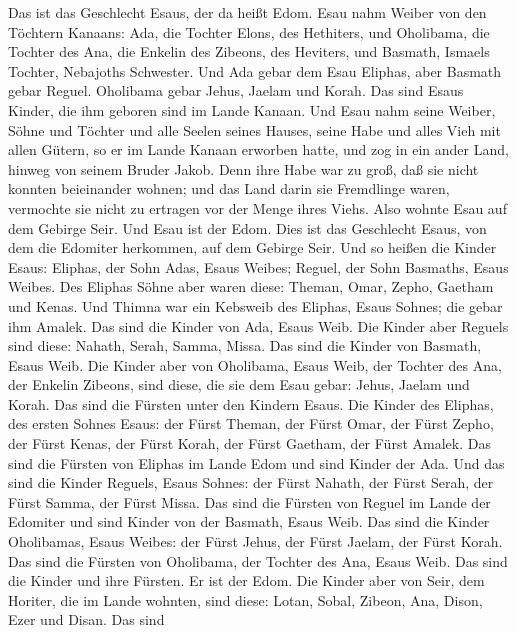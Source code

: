  Das ist das Geschlecht Esaus, der da heißt Edom.
 Esau nahm Weiber von den Töchtern Kanaans: Ada, die Tochter
Elons, des Hethiters, und Oholibama, die Tochter des Ana, die Enkelin
des Zibeons, des Heviters,  und Basmath, Ismaels Tochter,
Nebajoths Schwester.  Und Ada gebar dem Esau Eliphas, aber
Basmath gebar Reguel.  Oholibama gebar Jehus, Jaelam und
Korah. Das sind Esaus Kinder, die ihm geboren sind im Lande Kanaan.
 Und Esau nahm seine Weiber, Söhne und Töchter und alle
Seelen seines Hauses, seine Habe und alles Vieh mit allen Gütern, so er
im Lande Kanaan erworben hatte, und zog in ein ander Land, hinweg von
seinem Bruder Jakob.  Denn ihre Habe war zu groß, daß sie
nicht konnten beieinander wohnen; und das Land darin sie Fremdlinge
waren, vermochte sie nicht zu ertragen vor der Menge ihres Viehs.
 Also wohnte Esau auf dem Gebirge Seir. Und Esau ist der
Edom.  Dies ist das Geschlecht Esaus, von dem die Edomiter
herkommen, auf dem Gebirge Seir.  Und so heißen die Kinder
Esaus: Eliphas, der Sohn Adas, Esaus Weibes; Reguel, der Sohn Basmaths,
Esaus Weibes.  Des Eliphas Söhne aber waren diese: Theman,
Omar, Zepho, Gaetham und Kenas.  Und Thimna war ein
Kebsweib des Eliphas, Esaus Sohnes; die gebar ihm Amalek. Das sind die
Kinder von Ada, Esaus Weib.  Die Kinder aber Reguels sind
diese: Nahath, Serah, Samma, Missa. Das sind die Kinder von Basmath,
Esaus Weib.  Die Kinder aber von Oholibama, Esaus Weib, der
Tochter des Ana, der Enkelin Zibeons, sind diese, die sie dem Esau
gebar: Jehus, Jaelam und Korah.  Das sind die Fürsten unter
den Kindern Esaus. Die Kinder des Eliphas, des ersten Sohnes Esaus: der
Fürst Theman, der Fürst Omar, der Fürst Zepho, der Fürst Kenas,
 der Fürst Korah, der Fürst Gaetham, der Fürst Amalek. Das
sind die Fürsten von Eliphas im Lande Edom und sind Kinder der Ada.
 Und das sind die Kinder Reguels, Esaus Sohnes: der Fürst
Nahath, der Fürst Serah, der Fürst Samma, der Fürst Missa. Das sind die
Fürsten von Reguel im Lande der Edomiter und sind Kinder von der
Basmath, Esaus Weib.  Das sind die Kinder Oholibamas, Esaus
Weibes: der Fürst Jehus, der Fürst Jaelam, der Fürst Korah. Das sind die
Fürsten von Oholibama, der Tochter des Ana, Esaus Weib. 
Das sind die Kinder und ihre Fürsten. Er ist der Edom.  Die
Kinder aber von Seir, dem Horiter, die im Lande wohnten, sind diese:
Lotan, Sobal, Zibeon, Ana, Dison, Ezer und Disan.  Das sind
